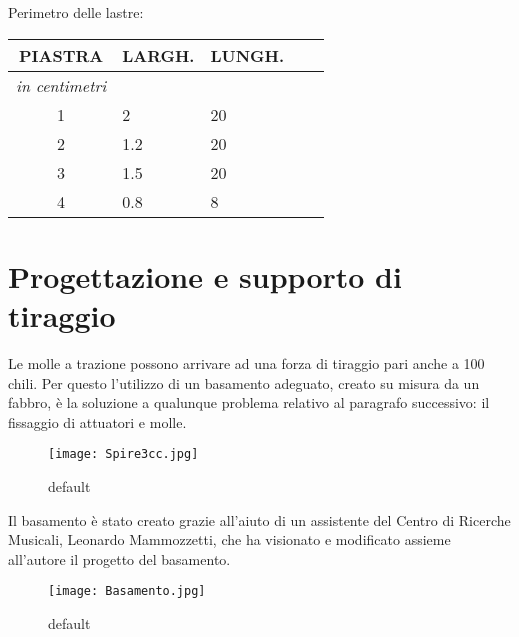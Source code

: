 Perimetro delle lastre:

\begin{tabular}{cp{2cm}p{2cm}p{.2cm}p{2cm}} \textbf{PIASTRA}&\textbf{LARGH.}&\textbf{LUNGH.}\\
\hline \textit{in centimetri} \\
\hline 1&2&20\\
\hline 2&1.2&20\\
\hline 3&1.5&20\\
\hline 4&0.8&8\\
\end{tabular}

\section{Progettazione e supporto di tiraggio}


Le molle a trazione possono arrivare ad una forza di tiraggio pari anche a 100 chili. Per questo l'utilizzo di un basamento adeguato, creato su misura da un fabbro, è la soluzione a qualunque problema relativo al paragrafo successivo: il fissaggio di attuatori e molle.

\begin{figure}[htbp]
\begin{center}
\texttt{[image: Spire3cc.jpg]}
\caption{default}
\label{default}
\end{center}
\end{figure}

Il basamento è stato creato grazie all'aiuto di un assistente del Centro di Ricerche Musicali, Leonardo Mammozzetti, che ha visionato e modificato assieme all'autore il progetto del basamento.


\begin{figure}[htbp]
\begin{center}
\texttt{[image: Basamento.jpg]}
\caption{default}
\label{default}
\end{center}
\end{figure}

